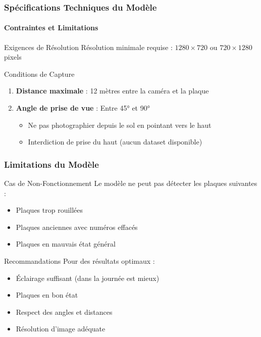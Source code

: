 \documentclass[
	11pt,
	aspectratio=169,
]{beamer}
\begin{document}
\begin{frame}
	\frametitle{Spécifications Techniques du Modèle}
	\framesubtitle{Contraintes et Limitations}
	
	\begin{alertblock}{Exigences de Résolution}
		Résolution minimale requise : $1280 \times 720$ ou $720 \times 1280$ pixels
	\end{alertblock}

	\begin{block}{Conditions de Capture}
		\begin{enumerate}
			\item \textbf{Distance maximale} : 12 mètres entre la caméra et la plaque
			
			\item \textbf{Angle de prise de vue} : Entre 45° et 90°
			\begin{itemize}
				\item Ne pas photographier depuis le sol en pointant vers le haut
				\item \alert{Interdiction de prise du haut} (aucun dataset disponible)
			\end{itemize}
		\end{enumerate}
	\end{block}
\end{frame}


\begin{frame}
	\frametitle{Limitations du Modèle}
	
	\begin{alertblock}{Cas de Non-Fonctionnement}
		Le modèle \alert{ne peut pas} détecter les plaques suivantes :
		\begin{itemize}
			\item Plaques trop rouillées
			\item Plaques anciennes avec numéros effacés
			\item Plaques en mauvais état général
		\end{itemize}
	\end{alertblock}
	
	\bigskip
	
	\begin{exampleblock}{Recommandations}
		Pour des résultats optimaux :
		\begin{itemize}
			\item Éclairage suffisant (dans la journée est mieux)
			\item Plaques en bon état
			\item Respect des angles et distances
			\item Résolution d'image adéquate
		\end{itemize}
	\end{exampleblock}
\end{frame}
\end{document}
